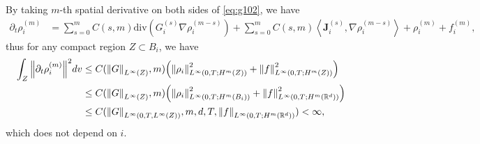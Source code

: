 \documentclass[a4paper, 11pt]{article}
\newcommand{\inner}[2]{\left< #1 , #2 \right>}
\theoremstyle{plain}
\theoremstyle{remark}
\theoremstyle{definition}
\renewcommand{\div}{\mathrm{div}}
\newcommand{\intt}{\int_0^T}
\newcommand{\intr}{\int_{B_R(0)}}
\newcommand{\J}{\boldsymbol{J}}
\begin{document}
By taking $m$-th spatial derivative on both sides of \eqref{eq:g102}, we have
\begin{equation}
\begin{aligned}
		\partial_t\rho_i^{(m)}&=\sum_{s=0}^mC(s,m)\div(G_i^{(s)}\nabla\rho_i^{(m-s)})+\sum_{s=0}^mC(s,m)\inner{\J_i^{(s)}}{\nabla\rho_i^{(m-s)}}+\rho_i^{(m)}+f_i^{(m)},
\end{aligned}
\end{equation}
		thus for any compact region $Z\subset B_i$, we have
		\begin{equation}\label{eq:g105}
		\begin{aligned}
				\int_{Z}\norm{\partial_t\rho_i^{(m)}}^2dv&\leq C(\norm{G}_{L^{\infty}(Z)},m)\Big(\norm{\rho_i}^2_{L^{\infty}(0,T;H^m(Z))}+\norm{f}_{L^{\infty}(0,T;H^m(Z))}^2\Big)\\
			&\leq C(\norm{G}_{L^{\infty}(Z)},m)\Big(\norm{\rho_i}^2_{L^{\infty}(0,T;H^m(B_i))}+\norm{f}_{L^{\infty}(0,T;H^m(\mathbb{R}^d))}^2\Big)\\
			&\leq C(\norm{G}_{L^{\infty}(0,T,L^{\infty}(Z))},m,d,T,\norm{f}_{L^{\infty}(0,T;H^m(\mathbb{R}^d))})<\infty,
		\end{aligned}
		\end{equation}
		which does not depend on $i$. 

        
\end{document}
